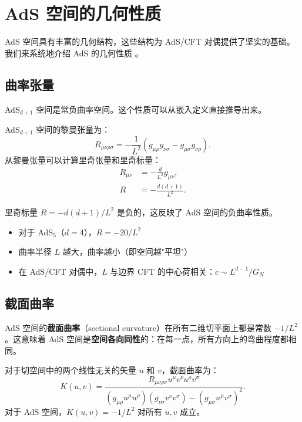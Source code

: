 \section{AdS 空间的几何性质}

AdS 空间具有丰富的几何结构，这些结构为 AdS/CFT 对偶提供了坚实的基础。我们来系统地介绍 AdS 的几何性质 \cite{Aharony1999}。

\subsection{曲率张量}

AdS$_{d+1}$ 空间是常负曲率空间。这个性质可以从嵌入定义直接推导出来。

\begin{property}
AdS$_{d+1}$ 空间的黎曼张量为：
\begin{equation}
    R_{\mu\nu\rho\sigma} = -\frac{1}{L^2} \left( g_{\mu\rho} g_{\nu\sigma} - g_{\mu\sigma} g_{\nu\rho} \right).
\end{equation}
从黎曼张量可以计算里奇张量和里奇标量：
\begin{align}
    R_{\mu\nu} &= -\frac{d}{L^2} g_{\mu\nu}, \\
    R &= -\frac{d(d+1)}{L^2}.
\end{align}
\end{property}

\begin{note}[曲率的物理意义]
里奇标量 $R = -d(d+1)/L^2$ 是负的，这反映了 AdS 空间的负曲率性质。
\begin{itemize}
    \item 对于 AdS$_5$（$d=4$），$R = -20/L^2$
    \item 曲率半径 $L$ 越大，曲率越小（即空间越"平坦"）
    \item 在 AdS/CFT 对偶中，$L$ 与边界 CFT 的中心荷相关：$c \sim L^{d-1}/G_N$
\end{itemize}
\end{note}

\subsection{截面曲率}

AdS 空间的\textbf{截面曲率}（sectional curvature）在所有二维切平面上都是常数 $-1/L^2$。这意味着 AdS 空间是\textbf{空间各向同性}的：在每一点，所有方向上的弯曲程度都相同。

\begin{definition}[截面曲率]
对于切空间中的两个线性无关的矢量 $u$ 和 $v$，截面曲率为：
\begin{equation}
    K(u, v) = \frac{R_{\mu\nu\rho\sigma} u^\mu v^\nu u^\rho v^\sigma}{(g_{\mu\rho} u^\mu u^\rho)(g_{\nu\sigma} v^\nu v^\sigma) - (g_{\mu\sigma} u^\mu v^\sigma)^2}.
\end{equation}
对于 AdS 空间，$K(u, v) = -1/L^2$ 对所有 $u, v$ 成立。
\end{definition}

